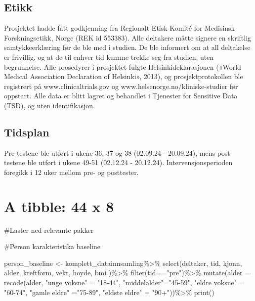 \documentclass[
  letterpaper,
  DIV=11,
  numbers=noendperiod]{scrreprt}
\newenvironment{Shaded}{\begin{snugshade}}{\end{snugshade}}
\newcommand{\AttributeTok}[1]{\textcolor[rgb]{0.40,0.45,0.13}{#1}}
\newcommand{\FunctionTok}[1]{\textcolor[rgb]{0.28,0.35,0.67}{#1}}
\newcommand{\NormalTok}[1]{\textcolor[rgb]{0.00,0.23,0.31}{#1}}
\newcommand{\OtherTok}[1]{\textcolor[rgb]{0.00,0.23,0.31}{#1}}
\newcommand{\SpecialCharTok}[1]{\textcolor[rgb]{0.37,0.37,0.37}{#1}}
\newcommand{\StringTok}[1]{\textcolor[rgb]{0.13,0.47,0.30}{#1}}
\begin{document}
\hypertarget{etikk}{%
\section{Etikk}\label{etikk}}

Prosjektet hadde fått godkjenning fra Regionalt Etisk Komité for
Medisinsk Forskningsetikk, Norge (REK id 553383). Alle deltakere måtte
signere en skriftlig samtykkeerklæring før de ble med i studien. De ble
informert om at all deltakelse er frivillig, og at de til enhver tid
kunnne trekke seg fra studien, uten begrunnelse. Alle prosedyrer i
prosjektet fulgte Helsinkideklarasjonen («World Medical Association
Declaration of Helsinki», 2013), og prosjektprotokollen ble registrert
på www.clinicaltrials.gov og www.helsenorge.no/kliniske-studier før
oppstart. Alle data er blitt lagret og behandlet i Tjenester for
Sensitive Data (TSD), og uten identifikasjon.

\hypertarget{tidsplan}{%
\section{Tidsplan}\label{tidsplan}}

Pre-testene ble utført i ukene 36, 37 og 38 (02.09.24 - 20.09.24), mens
post-testene ble utført i ukene 49-51 (02.12.24 - 20.12.24).
Intervensjonsperioden foregikk i 12 uker mellom pre- og posttester.


\hypertarget{a-tibble-44-x-8}{%
\chapter{A tibble: 44 x 8}\label{a-tibble-44-x-8}}

\#Laster ned relevante pakker

\#Person karakteristika baseline

\begin{Shaded}
\begin{Highlighting}[]
\NormalTok{person\_baseline }\OtherTok{\textless{}{-}}\NormalTok{ komplett\_datainnsamling}\SpecialCharTok{\%\textgreater{}\%}
  \FunctionTok{select}\NormalTok{(deltaker, tid, kjonn, alder, kreftform, vekt, hoyde, bmi )}\SpecialCharTok{\%\textgreater{}\%}
  \FunctionTok{filter}\NormalTok{(tid}\SpecialCharTok{==}\StringTok{"pre"}\NormalTok{)}\SpecialCharTok{\%\textgreater{}\%}
  \FunctionTok{mutate}\NormalTok{(}\AttributeTok{alder =} \FunctionTok{recode}\NormalTok{(alder, }\StringTok{"unge voksne"} \OtherTok{=} \StringTok{"18{-}44"}\NormalTok{, }\StringTok{"middelalder"}\OtherTok{=}\StringTok{"45{-}59"}\NormalTok{, }\StringTok{"eldre voksne"} \OtherTok{=} \StringTok{"60{-}74"}\NormalTok{, }\StringTok{"gamle eldre"} \OtherTok{=}\StringTok{"75{-}89"}\NormalTok{, }\StringTok{"eldste eldre"} \OtherTok{=} \StringTok{"90+"}\NormalTok{))}\SpecialCharTok{\%\textgreater{}\%}
  \FunctionTok{print}\NormalTok{()}
\end{Highlighting}
\end{Shaded}
\end{document}

